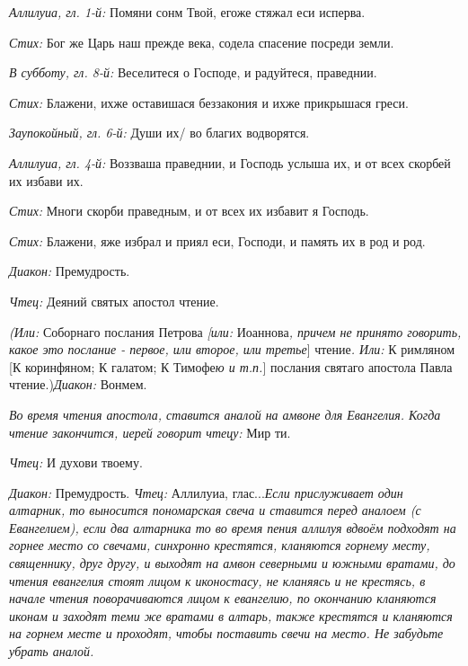  {\itshape Аллилуиа, гл. 1-й:} Помяни сонм Твой, егоже стяжал еси исперва.

 {\itshape Стих:} Бог же Царь наш прежде века, содела спасение посреди земли. 

 {\itshape В субботу, гл. 8-й:} Веселитеся о Господе, и радуйтеся, праведнии.

 {\itshape  Стих:} Блажени, ихже оставишася беззакония и ихже прикрышася греси.

 {\itshape  Заупокойный, гл. 6-й:} Души их/ во благих водворятся.

 {\itshape  Аллилуиа, гл. 4-й:} Воззваша праведнии, и Господь услыша их, и от всех скорбей их избави их.

 {\itshape  Стих:} Многи скорби праведным, и от всех их избавит я Господь.

 {\itshape  Стих:} Блажени, яже избрал и приял еси, Господи, и память их в род и род.

 {\itshape Диакон:} Премудрость.

 {\itshape  Чтец:} Деяний святых апостол чтение.

 {\itshape (Или:} Соборнаго послания Петрова {\itshape [или:} Иоаннова{\itshape , причем не принято говорить, какое это послание - первое, или второе, или третье}] чтение{\itshape . Или:} К римляном [К коринфяном; К галатом; К Тимофе{\itshape ю и т.п.}] послания святаго апостола Павла чтение.){\itshape  Диакон:} Вонмем. 


{\itshape Во время чтения апостола, ставится аналой на амвоне для Евангелия. Когда чтение закончится, иерей говорит чтецу:} Мир ти.

 {\itshape  Чтец:} И духови твоему. 


 {\itshape Диакон:} Премудрость. {\itshape Чтец:} Аллилуиа, глас...{\itshape  Если прислуживает один алтарник, то выносится пономарская свеча и ставится перед аналоем (с Евангелием), если два алтарника то во время пения аллилуя вдвоём подходят на горнее место со свечами, синхронно крестятся, кланяются горнему месту, священнику, друг другу, и выходят на амвон северными и южными вратами, до чтения евангелия стоят лицом к иконостасу, не кланяясь и не крестясь, в начале чтения поворачиваются лицом к евангелию, по окончанию кланяются иконам и заходят теми же вратами в алтарь, также крестятся и кланяются на горнем месте и проходят, чтобы поставить свечи на место. Не забудьте убрать аналой.} 

